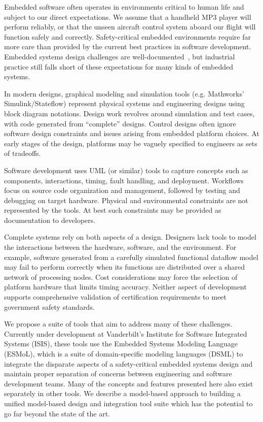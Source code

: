 
Embedded software often operates in environments critical to human life and subject to our direct expectations. We assume that a handheld MP3 player will perform reliably, or that the unseen aircraft control system aboard our flight will function safely and correctly. Safety-critical embedded environments require far more care than provided by the current best practices in software development. Embedded systems design challenges are well-documented~\cite{HenSif:2006}, but industrial practice still falls short of these expectations for many kinds of embedded systems.

In modern designs, graphical modeling and simulation tools (e.g. Mathworks' Simulink/Stateflow) represent physical systems and engineering designs using block diagram notations. Design work revolves around simulation and test cases, with code generated from "`complete"' designs. Control designs often ignore software design constraints and issues arising from embedded platform choices. At early stages of the design, platforms may be vaguely specified to engineers as sets of tradeoffs.

Software development uses UML (or similar) tools to capture concepts such as components, interactions, timing, fault handling, and deployment. Workflows focus on source code organization and management, followed by testing and debugging on target hardware. Physical and environmental constraints are not represented by the tools. At best such constraints may be provided as documentation to developers.

Complete systems rely on both aspects of a design.  
Designers lack tools to model the interactions between the
hardware, software, and the environment.  For example, software 
generated from a carefully simulated functional dataflow model may 
fail to perform correctly when its functions are distributed over a 
shared network of processing nodes.  Cost considerations may force the
selection of platform hardware that limits timing accuracy.  Neither 
aspect of development supports comprehensive validation of certification 
requirements to meet government safety standards. 

We propose a suite of tools
that aim to address many of these challenges.  Currently under development at
Vanderbilt's Institute for Software Integrated Systems (ISIS), these 
tools use the Embedded Systems Modeling Language (ESMoL), which is a
suite of domain-specific modeling languages (DSML) to integrate the 
disparate aspects of a safety-critical embedded systems design and 
maintain proper separation of concerns between engineering and software 
development teams.  Many of the concepts and features presented here also 
exist separately in other tools.  We describe a model-based approach to building 
a unified model-based design and integration tool suite which has the potential to go far beyond the state of the art.

